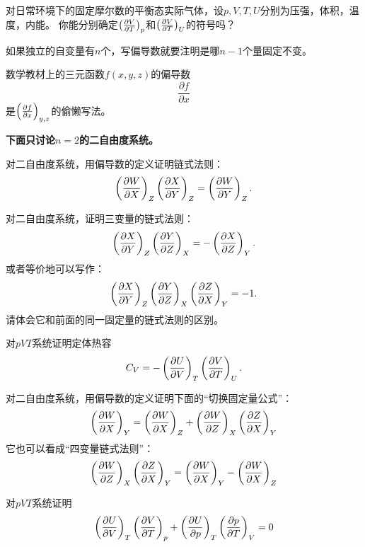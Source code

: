 \documentclass[CJK]{beamer}
\begin{document}
\begin{frame}
\bchL
{}

对日常环境下的固定摩尔数的平衡态实际气体，设$p,V,T,U$分别为压强，体积，温度，内能。
你能分别确定$\pfrac VTp$和$\pfrac VTU$的符号吗？
\echL
\end{frame}

\begin{frame}
\bchL
如果独立的自变量有$n$个，写偏导数就要注明是哪$n-1$个量固定不变。

数学教材上的三元函数$f(x,y,z)$的偏导数
$$\frac{\partial f}{\partial x}$$
是$\pfrac{f}{x}{y,z}$的偷懒写法。

\skipline

{\bf 下面只讨论$n=2$的二自由度系统。}
\echL
\end{frame}

\begin{frame}
\bchL
对二自由度系统，用偏导数的定义证明链式法则：{\blue
$$\pfrac WXZ\pfrac XYZ = \pfrac WYZ.$$}

\echL
\end{frame}

\begin{frame}
\bchL
对二自由度系统，证明三变量的链式法则：
{\blue 
$$\pfrac XYZ  \pfrac YZX = - \pfrac XZY.$$
}
或者等价地可以写作：
{\blue
$$\pfrac XYZ  \pfrac YZX \pfrac ZXY= -1 .$$
}
请体会它和前面的同一固定量的链式法则的区别。
\echL
\end{frame}

\begin{frame}
\bchL
{}

对$pVT$系统证明定体热容
$$C_V = -\pfrac UVT \pfrac VTU. $$

\echL
\end{frame}


\begin{frame}
\bchL
对二自由度系统，用偏导数的定义证明下面的“切换固定量公式”：
{\blue 
$$ \pfrac WXY = \pfrac WXZ + \pfrac WZX \pfrac ZXY$$
}
它也可以看成“四变量链式法则”：
{\blue 
$$ \pfrac WZX \pfrac ZXY =  \pfrac WXY - \pfrac WXZ $$
}
\echL
\end{frame}



\begin{frame}
\bchL
{}

对$pVT$系统证明
$$\pfrac UVT \pfrac VTp + \pfrac UpT \pfrac pTV = 0$$
\echL
\end{frame}
\end{document}
